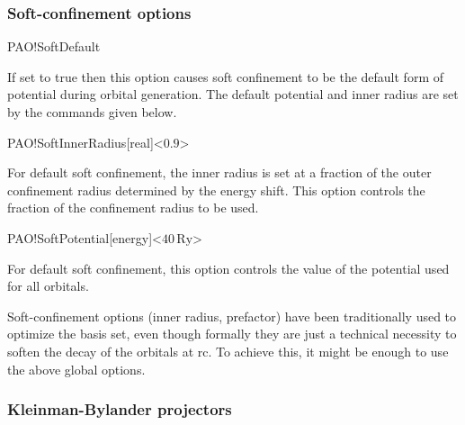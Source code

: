 \subsubsection{Soft-confinement options}

\begin{fdflogicalF}{PAO!SoftDefault}

  If set to true then this option causes soft confinement to be the
  default form of potential during orbital generation. The default
  potential and inner radius are set by the commands given below.

\end{fdflogicalF}

\begin{fdfentry}{PAO!SoftInnerRadius}[real]<$0.9$>

  For default soft confinement, the inner radius is set at a fraction
  of the outer confinement radius determined by the energy shift. This
  option controls the fraction of the confinement radius to be used.
  
\end{fdfentry}

\begin{fdfentry}{PAO!SoftPotential}[energy]<$40\,\mathrm{Ry}$>

  For default soft confinement, this option controls the value of the
  potential used for all orbitals.

  \note Soft-confinement options (inner radius, prefactor) have been
  traditionally used to optimize the basis set, even though formally
  they are just a technical necessity to soften the decay of the
  orbitals at rc. To achieve this, it might be enough to use the above
  global options.
  
\end{fdfentry}


\subsubsection{Kleinman-Bylander projectors}



